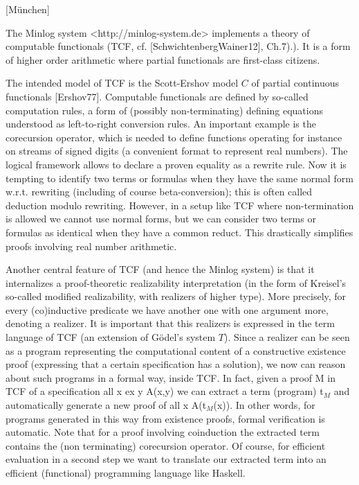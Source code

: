 [München]

The Minlog system <http://minlog-system.de> implements a theory of
computable functionals (TCF, cf. [SchwichtenbergWainer12], Ch.7).).
It is a form of higher order arithmetic where partial functionals are
first-class citizens.

The intended model of TCF is the Scott-Ershov model $C$ of partial
continuous functionals [Ershov77].  Computable functionals are defined
by so-called computation rules, a form of (possibly non-terminating)
defining equations understood as left-to-right conversion rules.  An
important example is the corecursion operator, which is needed to
define functions operating for instance on streams of signed digits (a
convenient format to represent real numbers).  The logical framework
allows to declare a proven equality as a rewrite rule.  Now it is
tempting to identify two terms or formulas when they have the same
normal form w.r.t. rewriting (including of course beta-conversion);
this is often called deduction modulo rewriting.  However, in a setup
like TCF where non-termination is allowed we cannot use normal forms,
but we can consider two terms or formulas as identical when they have
a common reduct.  This drastically simplifies proofs involving real
number arithmetic.

Another central feature of TCF (and hence the Minlog system) is that
it internalizes a proof-theoretic realizability interpretation (in the
form of Kreisel's so-called modified realizability, with realizers of
higher type).  More precisely, for every (co)inductive predicate we
have another one with one argument more, denoting a realizer.  It is
important that this realizers is expressed in the term language of TCF
(an extension of G\"odel's system $T$).  Since a realizer can be seen as
a program representing the computational content of a constructive
existence proof (expressing that a certain specification has a
solution), we now can reason about such programs in a formal way,
inside TCF.  In fact, given a proof M in TCF of a specification all x
ex y A(x,y) we can extract a term (program) t$_M$ and automatically
generate a new proof of all x A(t$_M$(x)).  In other words, for
programs generated in this way from existence proofs, formal
verification is automatic.  Note that for a proof involving
coinduction the extracted term contains the (non terminating)
corecursion operator.  Of course, for efficient evaluation in a second
step we want to translate our extracted term into an efficient
(functional) programming language like Haskell.

